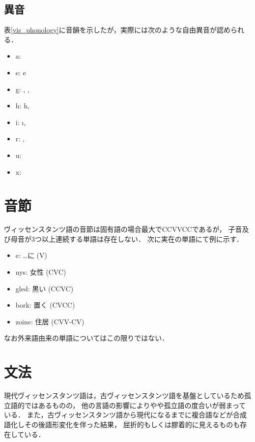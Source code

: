 \documentclass[uplatex,a4paper]{jsarticle}
\begin{document}
\subsection{異音}
表\ref{vis_phonology}に音韻を示したが，実際には次のような自由異音が認められる．
\begin{itemize}
 \item a: \textscripta
 \item e: e
 \item g: \textgamma, \textinvscr, \textscr
 \item h: h,\textchi
 \item i: \i, \textbari
 \item r: \textfishhookr, \textturnr
 \item u: \textbaru
 \item x: \textctc
\end{itemize}

\section{音節}
ヴィッセンスタンツ語の音節は固有語の場合最大でCCVVCCであるが，
子音及び母音が3つ以上連続する単語は存在しない．
次に実在の単語にて例に示す．
\begin{itemize}
 \item e: …に (V)
 \item nys: 女性 (CVC)
 \item gled: 黒い (CCVC)
 \item bork: 置く (CVCC)
 \item zoine: 住居 (CVV-CV)
\end{itemize}
なお外来語由来の単語についてはこの限りではない．

\section{文法}
現代ヴィッセンスタンツ語は，古ヴィッセンスタンツ語を基盤としているため孤立語的ではあるものの，
他の言語の影響によりやや孤立語の度合いが弱まっている．
また，古ヴィッセンスタンツ語から現代になるまでに複合語などが合成語化しその後語形変化を伴った結果，
屈折的もしくは膠着的に見えるものも存在している．

\end{document}
